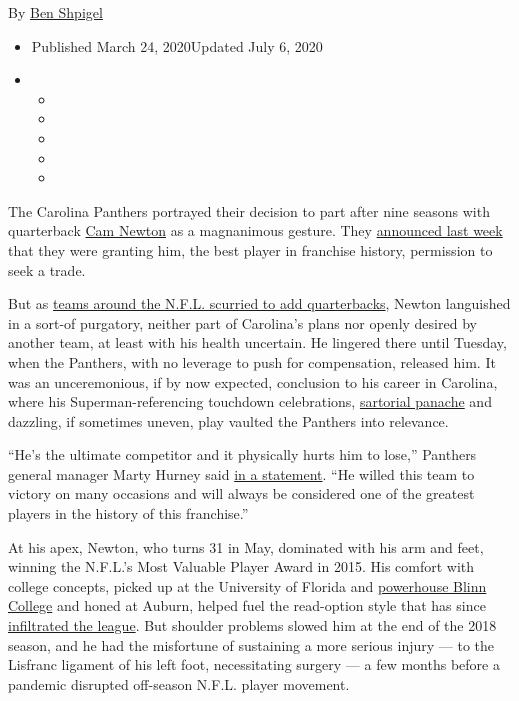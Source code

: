 By \href{https://www.nytimes3xbfgragh.onion/by/ben-shpigel}{Ben Shpigel}

\begin{itemize}
\item
  Published March 24, 2020Updated July 6, 2020
\item
  \begin{itemize}
  \item
  \item
  \item
  \item
  \item
  \end{itemize}
\end{itemize}

The Carolina Panthers portrayed their decision to part after nine
seasons with quarterback
\href{https://www.nytimes3xbfgragh.onion/2020/07/06/sports/football/cam-newton-new-england-patriots.html}{Cam
Newton} as a magnanimous gesture. They
\href{https://twitter.com/Panthers/status/1239929529780576256}{announced
last week} that they were granting him, the best player in franchise
history, permission to seek a trade.

But as
\href{https://www.nytimes3xbfgragh.onion/2020/03/18/sports/football/nfl-free-agency.html}{teams
around the N.F.L. scurried to add quarterbacks}, Newton languished in a
sort-of purgatory, neither part of Carolina's plans nor openly desired
by another team, at least with his health uncertain. He lingered there
until Tuesday, when the Panthers, with no leverage to push for
compensation, released him. It was an unceremonious, if by now expected,
conclusion to his career in Carolina, where his Superman-referencing
touchdown celebrations,
\href{https://www.nytimes3xbfgragh.onion/2013/12/12/fashion/NFL-Cam-Newton-fined-for-fashion-faux-pas.html}{sartorial
panache} and dazzling, if sometimes uneven, play vaulted the Panthers
into relevance.

``He's the ultimate competitor and it physically hurts him to lose,''
Panthers general manager Marty Hurney said
\href{https://www.panthers.com/news/carolina-panthers-release-qb-cam-newton}{in
a statement}. ``He willed this team to victory on many occasions and
will always be considered one of the greatest players in the history of
this franchise.''

At his apex, Newton, who turns 31 in May, dominated with his arm and
feet, winning the N.F.L.'s Most Valuable Player Award in 2015. His
comfort with college concepts, picked up at the University of Florida
and
\href{https://www.nytimes3xbfgragh.onion/2016/02/03/sports/football/super-bowl-50-cam-newton-blinn-college.html}{powerhouse
Blinn College} and honed at Auburn, helped fuel the read-option style
that has since
\href{https://www.nytimes3xbfgragh.onion/2019/08/13/sports/air-raid-kliff-kingsbury-kyler-murray.html}{infiltrated
the league}. But shoulder problems slowed him at the end of the 2018
season, and he had the misfortune of sustaining a more serious injury
--- to the Lisfranc ligament of his left foot, necessitating surgery ---
a few months before a pandemic disrupted off-season N.F.L. player
movement.

